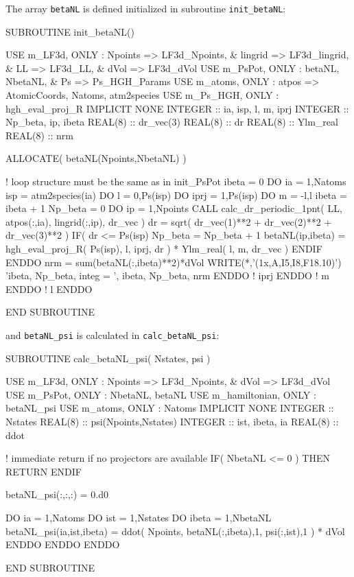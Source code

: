 The array {\tt betaNL} is defined initialized in subroutine {\tt init\_betaNL}:

\begin{fortrancode}
SUBROUTINE init_betaNL()

  USE m_LF3d, ONLY : Npoints => LF3d_Npoints, &
                     lingrid => LF3d_lingrid, &
                     LL => LF3d_LL, &
                     dVol => LF3d_dVol
  USE m_PsPot, ONLY : betaNL, NbetaNL, &
                      Ps => Ps_HGH_Params
  USE m_atoms, ONLY : atpos => AtomicCoords, Natoms, atm2species
  USE m_Ps_HGH, ONLY : hgh_eval_proj_R
  IMPLICIT NONE
  INTEGER :: ia, isp, l, m, iprj
  INTEGER :: Np_beta, ip, ibeta
  REAL(8) :: dr_vec(3)
  REAL(8) :: dr
  REAL(8) :: Ylm_real
  REAL(8) :: nrm

  ALLOCATE( betaNL(Npoints,NbetaNL) )

  ! loop structure must be the same as in init_PsPot
  ibeta = 0
  DO ia = 1,Natoms
    isp = atm2species(ia)
    DO l = 0,Ps(isp)%
      DO iprj = 1,Ps(isp)%
        DO m = -l,l
          ibeta = ibeta + 1
          Np_beta = 0
          DO ip = 1,Npoints
            CALL calc_dr_periodic_1pnt( LL, atpos(:,ia), lingrid(:,ip), dr_vec )
            dr = sqrt( dr_vec(1)**2 + dr_vec(2)**2 + dr_vec(3)**2 )
            IF( dr <= Ps(isp)%
              Np_beta = Np_beta + 1
              betaNL(ip,ibeta) = hgh_eval_proj_R( Ps(isp), l, iprj, dr ) * Ylm_real( l, m, dr_vec )
            ENDIF
          ENDDO
          nrm = sum(betaNL(:,ibeta)**2)*dVol
          WRITE(*,'(1x,A,I5,I8,F18.10)') 'ibeta, Np_beta, integ = ', ibeta, Np_beta, nrm
        ENDDO ! iprj
      ENDDO ! m
    ENDDO ! l
  ENDDO

END SUBROUTINE
\end{fortrancode}


and {\tt betaNL\_psi} is calculated in {\tt calc\_betaNL\_psi}:

\begin{fortrancode}
SUBROUTINE calc_betaNL_psi( Nstates, psi )

  USE m_LF3d, ONLY : Npoints => LF3d_Npoints, &
                       dVol => LF3d_dVol
  USE m_PsPot, ONLY : NbetaNL, betaNL
  USE m_hamiltonian, ONLY : betaNL_psi
  USE m_atoms, ONLY : Natoms
  IMPLICIT NONE
  INTEGER :: Nstates
  REAL(8) :: psi(Npoints,Nstates)
  INTEGER :: ist, ibeta, ia
  REAL(8) :: ddot

  ! immediate return if no projectors are available
  IF( NbetaNL <= 0 ) THEN
    RETURN
  ENDIF

  betaNL_psi(:,:,:) = 0.d0

  DO ia = 1,Natoms
    DO ist = 1,Nstates
      DO ibeta = 1,NbetaNL
        betaNL_psi(ia,ist,ibeta) = ddot( Npoints, betaNL(:,ibeta),1, psi(:,ist),1 ) * dVol
      ENDDO
    ENDDO
  ENDDO

END SUBROUTINE
\end{fortrancode}

